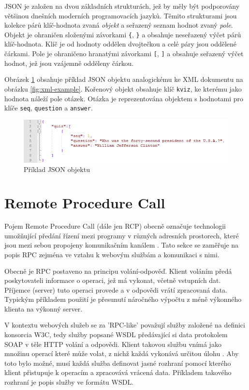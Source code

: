 \documentclass[czech,DP]{thesiskiv}
\begin{document}
JSON je založen na dvou základních strukturách, jež by měly být podporovány většinou dnešních moderních programovacích jazyků. Těmito strukturami jsou kolekce párů klíč-hodnota zvaná \textit{objekt} a seřazený seznam hodnot zvaný \textit{pole}. Objekt je ohraničen složenými závorkami \verb|{|, \verb|}| a obsahuje neseřazený výčet párů klíč-hodnota. Klíč je od hodnoty oddělen dvojtečkou a celé páry jsou oddělené čárkami. Pole je ohraničeno hranatými závorkami \verb|[|, \verb|]| a obsahuje seřazený výčet hodnot, jež jsou vzájemně odděleny čárkou.

Obrázek \ref{fig:json-examle} obsahuje příklad JSON objektu analogickému ke XML dokumentu na obrázku \ref{fig:xml-example}. Kořenový objekt obsahuje klíč \verb|kviz|, ke kterému jako hodnota náleží pole otázek. Otázka je reprezentována objektem s hodnotami pro klíče \verb|seq|, \verb|question| a \verb|answer|.

\begin{figure}[h]
	\centering
	\includegraphics[width=\linewidth]{json-example.png}
	\caption{Příklad JSON objektu}
	\label{fig:json-examle}
\end{figure}

\section{Remote Procedure Call}
\label{sec:rpc-ws}

Pojem Remote Procedure Call (dále jen RCP) obecně označuje technologii umožňující předání řízení mezi programy v různých adresních prostorech, které jsou mezi sebou propojeny komunikačním kanálem \cite{rpcThesis}. Tato sekce se zaměřuje na popis RPC zejména ve vztahu k webovým službám a komunikaci s nimi.

Obecně je RPC postaveno na principu volání-odpověď. Klient voláním předá poskytovateli informace o operaci, jež má vykonat, včetně vstupních dat. Příjemce (server) tuto operaci provede a v odpovědi vrátí zpracovaná data. Typickým příkladem použití je přesunutí náročného výpočtu z méně výkonného klienta na výkonný server.

V kontextu webových služeb se za 'RPC-like' považují služby založené na definici konsorcia W3C, tedy služby popsané WSDL předávající si data protokolem SOAP v těle HTTP volání a odpovědi. Klient takovou službu vnímá jako množinu operací které může volat, z nichž každá vykonává určitou úlohu  \cite{rpcVsRest}. Aby toto bylo možné, musí každá služba definovat jasné rozhraní pomocí kterého klient přistupuje k operacím a zpracovává vrácená data. Příkladem takového rozhraní je popis služby ve formátu WSDL. 
\end{document}
